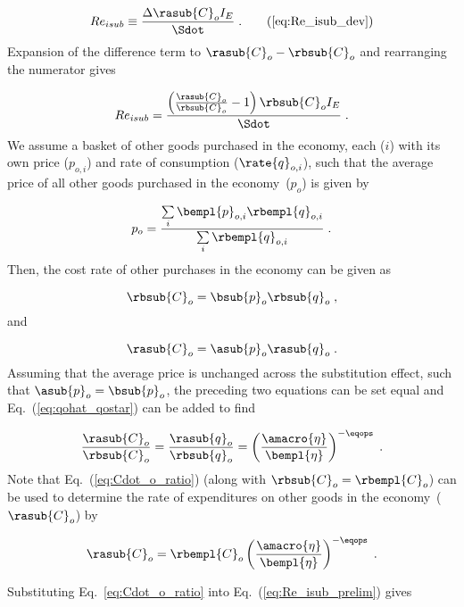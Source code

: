 \begin{equation}
  Re_{isub} \equiv \frac{\Delta \rasub{C}_o I_E}{\Sdot} \; .  \tag{\ref{eq:Re_isub_dev}}
\end{equation}
%
Expansion of the difference term to $\rasub{C}_o - \rbsub{C}_o$ and rearranging the numerator gives

\begin{equation} \label{eq:Re_isub_prelim}
  Re_{isub} = \frac{\left( \frac{\rasub{C}_o}{\rbsub{C}_o} - 1  \right) \rbsub{C}_o I_E} {\Sdot} \; .
\end{equation}
%
We assume a basket of other goods purchased in the economy,
each ($i$) with its own price ($p_{o,i}$) and rate of consumption ($\rate{q}_{o,i}$),
such that the average price of all other goods purchased in the economy~($p_o$) is given by

\begin{equation}
  p_o = \frac{\sum\limits_i \bempl{p}_{o,i} \rbempl{q}_{o,i}}{\sum\limits_i \rbempl{q}_{o,i}} \; .
\end{equation}
%
Then, the cost rate of other purchases in the economy can be given as

\begin{equation}
  \rbsub{C}_o = \bsub{p}_o \rbsub{q}_o \; ,
\end{equation}
%
and

\begin{equation}
  \rasub{C}_o = \asub{p}_o \rasub{q}_o \; .
\end{equation}
%
Assuming that the average price is unchanged across the substitution effect,
such that $\asub{p}_o = \bsub{p}_o$,
the preceding two equations can be set equal and Eq.~(\ref{eq:qohat_qostar}) can be added to find

\begin{equation} \label{eq:Cdot_o_ratio}
  \frac{\rasub{C}_o}{\rbsub{C}_o} 
      = \frac{\rasub{q}_o}{\rbsub{q}_o} 
      = \left( \frac{\amacro{\eta}}{\bempl{\eta}} \right)^{-\eqops}  \; .
\end{equation}
%
Note that Eq.~(\ref{eq:Cdot_o_ratio}) 
(along with $\rbsub{C}_o = \rbempl{C}_o$)
can be used to determine the rate of expenditures 
on other goods in the economy~($\rasub{C}_o$) by

\begin{equation}
  \rasub{C}_o = \rbempl{C}_o \left( \frac{\amacro{\eta}}{\bempl{\eta}} \right)^{-\eqops} \; .
\end{equation}

Substituting Eq.~\ref{eq:Cdot_o_ratio} into Eq.~(\ref{eq:Re_isub_prelim}) gives

